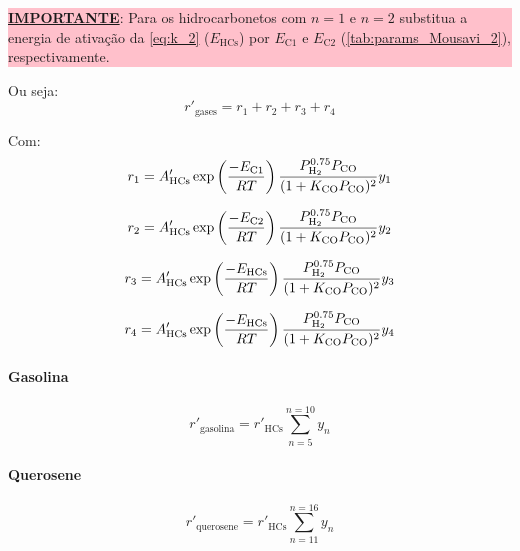 \documentclass[portuguese,12pt,a4paper,onecolumn]{article}
\begin{document}
	\colorbox{pink}{\parbox{\textwidth}{
			\textbf{\underline{IMPORTANTE}}: Para os hidrocarbonetos com $n = 1$ e $n = 2$ substitua a energia de ativação da \autoref{eq:k_2} ($E_\mathrm{HCs}$) por $E_{\mathrm{C1}}$ e $E_{\mathrm{C2}}$ (\autoref{tab:params_Mousavi_2}), respectivamente.
	}}

	Ou seja:
	\begin{equation}
		r'_\mathrm{gases} = r_1 + r_2 + r_3 + r_4
		\label{eq:r_gases_2}
	\end{equation}
	
	Com:
	\begin{equation}
		r_1 = A'_\mathrm{ HCs } \exp \left ( \frac{-E_\mathrm{C1}}{RT} \right ) \frac{P_{\ce{H2}}^{0.75}P_\mathrm{CO}}{(1 + K_\mathrm{CO}P_\mathrm{CO})^2} y_1
	\end{equation}
	
	\begin{equation}
		r_2 = A'_\mathrm{ HCs } \exp \left ( \frac{-E_\mathrm{C2}}{RT} \right ) \frac{P_{\ce{H2}}^{0.75}P_\mathrm{CO}}{(1 + K_\mathrm{CO}P_\mathrm{CO})^2} y_2
	\end{equation}
	
	\begin{equation}
		r_3 = A'_\mathrm{ HCs } \exp \left ( \frac{-E_\mathrm{HCs}}{RT} \right ) \frac{P_{\ce{H2}}^{0.75}P_\mathrm{CO}}{(1 + K_\mathrm{CO}P_\mathrm{CO})^2} y_3
	\end{equation}
	
	\begin{equation}
		r_4 = A'_\mathrm{ HCs } \exp \left ( \frac{-E_\mathrm{HCs}}{RT} \right ) \frac{P_{\ce{H2}}^{0.75}P_\mathrm{CO}}{(1 + K_\mathrm{CO}P_\mathrm{CO})^2} y_4
	\end{equation}
	

	\paragraph{Gasolina}
	\begin{equation}
		r'_\mathrm{gasolina} = r'_\mathrm{ HCs } \sum_{n=5}^{n=10} y_n
	\end{equation}
	
	\paragraph{Querosene}
	\begin{equation}
		r'_\mathrm{querosene} = r'_\mathrm{ HCs } \sum_{n=11}^{n=16} y_n
	\end{equation}
	
\end{document}
